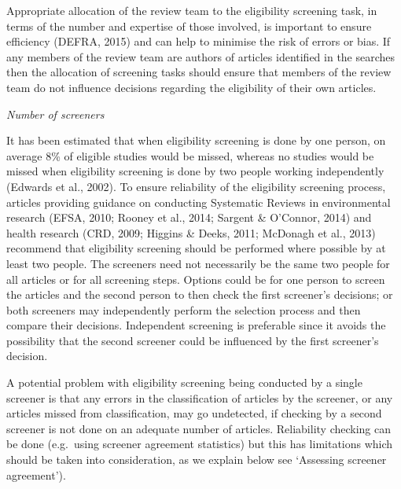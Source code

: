 \documentclass[
  letterpaper,
  DIV=11,
  numbers=noendperiod]{scrreprt}
\begin{document}
Appropriate allocation of the review team to the eligibility screening
task, in terms of the number and expertise of those involved, is
important to ensure efficiency (DEFRA, 2015) and can help to minimise
the risk of errors or bias. If any members of the review team are
authors of articles identified in the searches then the allocation of
screening tasks should ensure that members of the review team do not
influence decisions regarding the eligibility of their own articles.

\emph{Number of screeners}

It has been estimated that when eligibility screening is done by one
person, on average 8\% of eligible studies would be missed, whereas no
studies would be missed when eligibility screening is done by two people
working independently (Edwards et al., 2002). To ensure reliability of
the eligibility screening process, articles providing guidance on
conducting Systematic Reviews in environmental research (EFSA, 2010;
Rooney et al., 2014; Sargent \& O'Connor, 2014) and health research
(CRD, 2009; Higgins \& Deeks, 2011; McDonagh et al., 2013) recommend
that eligibility screening should be performed where possible by at
least two people. The screeners need not necessarily be the same two
people for all articles or for all screening steps. Options could be for
one person to screen the articles and the second person to then check
the first screener's decisions; or both screeners may independently
perform the selection process and then compare their decisions.
Independent screening is preferable since it avoids the possibility that
the second screener could be influenced by the first screener's
decision.

A potential problem with eligibility screening being conducted by a
single screener is that any errors in the classification of articles by
the screener, or any articles missed from classification, may go
undetected, if checking by a second screener is not done on an adequate
number of articles. Reliability checking can be done (e.g.~using
screener agreement statistics) but this has limitations which should be
taken into consideration, as we explain below see `Assessing screener
agreement').
\end{document}
